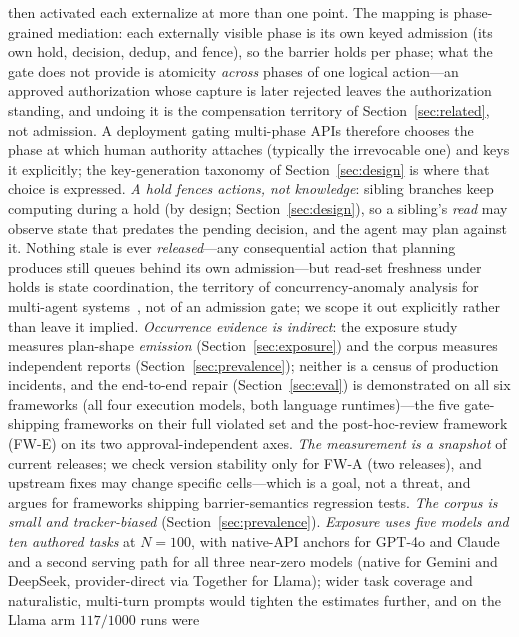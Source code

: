 \documentclass[10pt,journal,compsoc]{IEEEtran}
\begin{document}
then activated each externalize at more than one point. The mapping is
phase-grained mediation: each externally visible phase is its own keyed
admission (its own hold, decision, dedup, and fence), so the barrier holds
per phase; what the gate does not provide is atomicity \emph{across} phases
of one logical action---an approved authorization whose capture is later
rejected leaves the authorization standing, and undoing it is the
compensation territory of Section~\ref{sec:related}, not admission. A
deployment gating multi-phase APIs therefore chooses the phase at which
human authority attaches (typically the irrevocable one) and keys it
explicitly; the key-generation taxonomy of Section~\ref{sec:design} is where
that choice is expressed. \emph{A hold fences actions, not knowledge}: sibling
branches keep computing during a hold (by design; Section~\ref{sec:design}),
so a sibling's \emph{read} may observe state that predates the pending
decision, and the agent may plan against it. Nothing stale is ever
\emph{released}---any consequential action that planning produces still
queues behind its own admission---but read-set freshness under holds is
state coordination, the territory of concurrency-anomaly analysis for
multi-agent systems~\cite{khan26}, not of an admission gate; we scope it out
explicitly rather than leave it implied. \emph{Occurrence evidence is indirect}: the exposure study
measures plan-shape \emph{emission} (Section~\ref{sec:exposure}) and the
corpus measures independent reports (Section~\ref{sec:prevalence}); neither is
a census of production incidents, and the end-to-end repair
(Section~\ref{sec:eval}) is demonstrated on all six frameworks (all
four execution models, both language runtimes)---the five gate-shipping
frameworks on their full violated set and the post-hoc-review framework
(\textsf{FW-E}) on its two approval-independent axes. \emph{The measurement is a snapshot} of current releases; we check
version stability only for \textsf{FW-A} (two releases), and upstream fixes
may change specific cells---which is a goal, not a threat, and argues for
frameworks shipping barrier-semantics regression tests. \emph{The corpus is
small and tracker-biased} (Section~\ref{sec:prevalence}). \emph{Exposure uses
five models and ten authored tasks} at $N{=}100$, with native-API anchors for
GPT-4o and Claude and a second serving path for all three near-zero models
(native for Gemini and DeepSeek, provider-direct via Together for Llama);
wider task coverage and naturalistic, multi-turn prompts would
tighten the estimates further, and on the Llama arm $117/1000$ runs were
\end{document}
